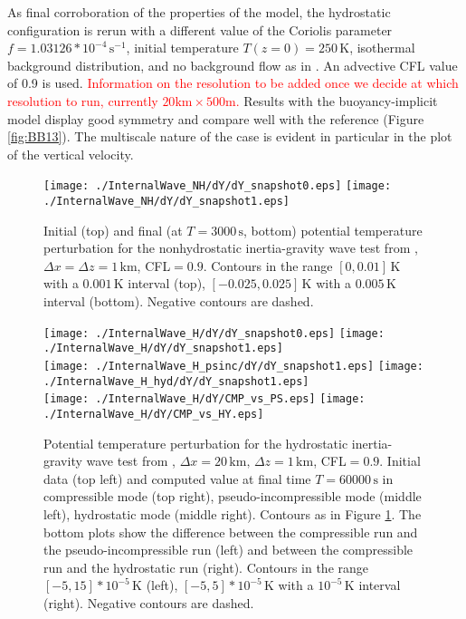 \documentclass{ametsoc}
\theoremstyle{definition}
\newcommand{\benacchio}[1]{\textcolor{red}{#1}}
\begin{document}
As final corroboration of the properties of the model, the hydrostatic configuration is rerun with a different value of the Coriolis parameter $f=1.03126*10^{-4}\,\textrm{s}^{-1}$, initial temperature $T(z=0)=250\,\textrm{K}$, isothermal background distribution, and no background flow as in \cite{BaldaufBrdar2013}. An advective CFL value of 0.9 is used. \benacchio{Information on the resolution to be added once we decide at which resolution to run, currently $20\textrm{km}\times500\textrm{m}$.} Results with the buoyancy-implicit model display good symmetry and compare well with the reference (Figure \ref{fig:BB13}). The multiscale nature of the case is evident in particular in the plot of the vertical velocity.


\begin{figure}
\centering
 \texttt{[image: ./InternalWave\_NH/dY/dY\_snapshot0.eps]}
 \texttt{[image: ./InternalWave\_NH/dY/dY\_snapshot1.eps]}
 \caption{Initial (top) and final (at $T=3000\,\textrm{s}$, bottom) potential temperature perturbation for the nonhydrostatic inertia-gravity wave test from \cite{SkamarockKlemp1994}, $\Delta x=\Delta z=1\,\textrm{km}$, CFL$=0.9$. Contours in the range $[0, 0.01]\,\textrm{K}$ with a $0.001\,\textrm{K}$ interval (top), $[-0.025, 0.025]\,\textrm{K}$ with a $0.005\,\textrm{K}$ interval (bottom). Negative contours are dashed.}
 \label{fig:SK94_NH}
\end{figure}

\begin{figure}
\centering
 \texttt{[image: ./InternalWave\_H/dY/dY\_snapshot0.eps]}
 \texttt{[image: ./InternalWave\_H/dY/dY\_snapshot1.eps]}\\
 \texttt{[image: ./InternalWave\_H\_psinc/dY/dY\_snapshot1.eps]}
 \texttt{[image: ./InternalWave\_H\_hyd/dY/dY\_snapshot1.eps]}\\
  \texttt{[image: ./InternalWave\_H/dY/CMP\_vs\_PS.eps]}
 \texttt{[image: ./InternalWave\_H/dY/CMP\_vs\_HY.eps]}
 \caption{Potential temperature perturbation for the hydrostatic inertia-gravity wave test from \cite{SkamarockKlemp1994},  $\Delta x=20\,\textrm{km},\,\Delta z=1\,\textrm{km}$, CFL$=0.9$. Initial data (top left) and computed value at final time $T=60000\,\textrm{s}$ in compressible mode (top right), pseudo-incompressible mode (middle left), hydrostatic mode (middle right). Contours as in Figure \ref{fig:SK94_NH}. The bottom plots show the difference between the compressible run and the pseudo-incompressible run (left) and between the compressible run and the hydrostatic run (right). Contours in the range $[-5, 15]*10^{-5}\,\textrm{K}$ (left), $[-5, 5]*10^{-5}\,\textrm{K}$  with a $10^{-5}\,\textrm{K}$ interval (right). Negative contours are dashed.}
 \label{fig:SK94_H} 
 \end{figure}
\end{document}

